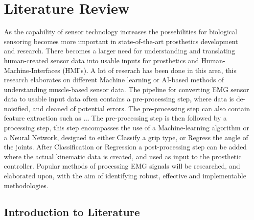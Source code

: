 \documentclass[../main.tex]{subfiles}
\begin{document}
\section{Literature Review}
\label{sec:literature}

As the capability of sensor technology increases the possebilities for biological sensoring becomes more important in state-of-the-art prosthetics development and research.
There becomes a larger need for understanding and translating human-created sensor data into usable inputs for prosthetics and Human-Machine-Interfaces (HMI's).
A lot of reserach has been done in this area, this research elaborates on different Machine learning or AI-based methods of understanding muscle-based sensor data.
The pipeline for converting EMG sensor data to usable input data often contains a pre-processing step, where data is de-noisified, and cleaned of potential errors.
The pre-processing step can also contain feature extraction such as ...
The pre-processing step is then followed by a processing step, this step encompasses the use of a Machine-learning algorithm or a Neural Network, designed to either Classify a grip type, or Regress the angle of the joints.
After Classification or Regression a post-processing step can be added where the actual kinematic data is created, and used as input to the prosthetic controller. 
Popular methods of processing EMG signals will be researched, and elaborated upon, with the aim of identifying robust, effective and implementable methodologies.


\subsection{Introduction to Literature}
\end{document}
